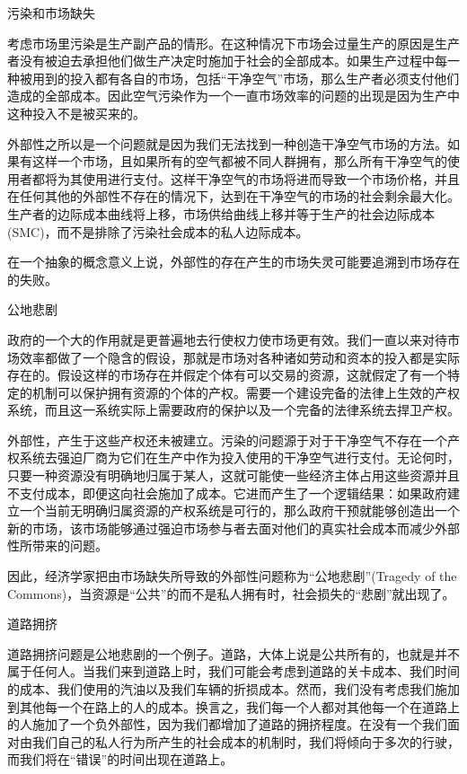 \documentclass{article}
\begin{document}
污染和市场缺失

考虑市场里污染是生产副产品的情形。在这种情况下市场会过量生产的原因是生产者没有被迫去承担他们做生产决定时施加于社会的全部成本。如果生产过程中每一种被用到的投入都有各自的市场，包括“干净空气”市场，那么生产者必须支付他们造成的全部成本。因此空气污染作为一个一直市场效率的问题的出现是因为生产中这种投入不是被买来的。

外部性之所以是一个问题就是因为我们无法找到一种创造干净空气市场的方法。如果有这样一个市场，且如果所有的空气都被不同人群拥有，那么所有干净空气的使用者都将为其使用进行支付。这样干净空气的市场将进而导致一个市场价格，并且在任何其他的外部性不存在的情况下，达到在干净空气的市场的社会剩余最大化。生产者的边际成本曲线将上移，市场供给曲线上移并等于生产的社会边际成本(SMC)，而不是排除了污染社会成本的私人边际成本。

在一个抽象的概念意义上说，外部性的存在产生的市场失灵可能要追溯到市场存在的失败。

\hspace*{\fill}

公地悲剧

政府的一个大的作用就是更普遍地去行使权力使市场更有效。我们一直以来对待市场效率都做了一个隐含的假设，那就是市场对各种诸如劳动和资本的投入都是实际存在的。假设这样的市场存在并假定个体有可以交易的资源，这就假定了有一个特定的机制可以保护拥有资源的个体的产权。需要一个建设完备的法律上生效的产权系统，而且这一系统实际上需要政府的保护以及一个完备的法律系统去捍卫产权。

外部性，产生于这些产权还未被建立。污染的问题源于对于干净空气不存在一个产权系统去强迫厂商为它们在生产中作为投入使用的干净空气进行支付。无论何时，只要一种资源没有明确地归属于某人，这就可能使一些经济主体占用这些资源并且不支付成本，即便这向社会施加了成本。它进而产生了一个逻辑结果：如果政府建立一个当前无明确归属资源的产权系统是可行的，那么政府干预就能够创造出一个新的市场，该市场能够通过强迫市场参与者去面对他们的真实社会成本而减少外部性所带来的问题。

因此，经济学家把由市场缺失所导致的外部性问题称为“公地悲剧”(Tragedy of the Commons)，当资源是“公共”的而不是私人拥有时，社会损失的“悲剧”就出现了。

\hspace*{\fill}

道路拥挤

道路拥挤问题是公地悲剧的一个例子。道路，大体上说是公共所有的，也就是并不属于任何人。当我们来到道路上时，我们可能会考虑到道路的关卡成本、我们时间的成本、我们使用的汽油以及我们车辆的折损成本。然而，我们没有考虑我们施加到其他每一个在路上的人的成本。换言之，我们每一个人都对其他每一个在道路上的人施加了一个负外部性，因为我们都增加了道路的拥挤程度。在没有一个我们面对由我们自己的私人行为所产生的社会成本的机制时，我们将倾向于多次的行驶，而我们将在“错误”的时间出现在道路上。
\end{document}
